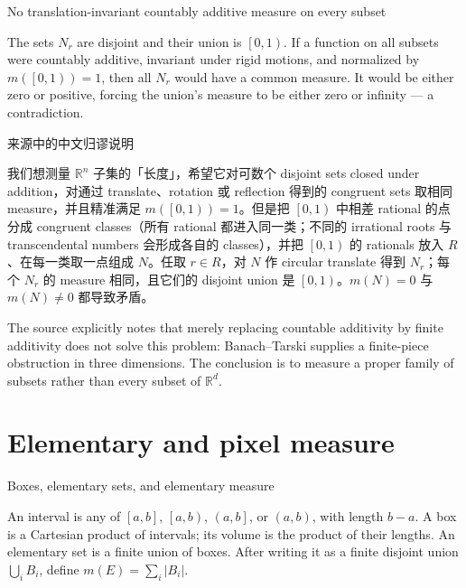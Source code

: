 \begin{theorem}{No translation-invariant countably additive measure on every subset}

The sets \(N_{r}\) are disjoint and their union is \(\left\lbrack {0,1} \right)\). If a function on all subsets were countably additive, invariant under rigid motions, and normalized by \(m\left( \left\lbrack {0,1} \right) \right) = 1\), then all \(N_{r}\) would have a common measure. It would be either zero or positive, forcing the union's measure to be either zero or infinity --- a contradiction.

\end{theorem}

\begin{qlsolution}{来源中的中文归谬说明}

我们想测量 \(\mathbb{R}^{n}\) 子集的「长度」，希望它对可数个 disjoint sets closed under addition，对通过 translate、rotation 或 reflection 得到的 congruent sets 取相同 measure，并且精准满足 \(m\left( \left\lbrack {0,1} \right) \right) = 1\)。但是把 \(\left\lbrack {0,1} \right)\) 中相差 rational 的点分成 congruent classes（所有 rational 都进入同一类；不同的 irrational roots 与 transcendental numbers 会形成各自的 classes），并把 \(\left\lbrack {0,1} \right)\) 的 rationals 放入 \(R\)、在每一类取一点组成 \(N\)。任取 \(r \in R\)，对 \(N\) 作 circular translate 得到 \(N_{r}\)；每个 \(N_{r}\) 的 measure 相同，且它们的 disjoint union 是 \(\left\lbrack {0,1} \right)\)。\(m(N) = 0\) 与 \(m(N) \neq 0\) 都导致矛盾。

\end{qlsolution}

The source explicitly notes that merely replacing countable additivity by finite additivity does not solve this problem: Banach--Tarski supplies a finite-piece obstruction in three dimensions. The conclusion is to measure a proper family of subsets rather than every subset of \(\mathbb{R}^{d}\).

\section{Elementary and pixel measure}

\begin{definition}{Boxes, elementary sets, and elementary measure}

An interval is any of \(\left\lbrack {a,b} \right\rbrack\), \(\left\lbrack {a,b} \right)\), \(\left( {a,b} \right\rbrack\), or \(\left( {a,b} \right)\), with length \(b - a\). A box is a Cartesian product of intervals; its volume is the product of their lengths. An elementary set is a finite union of boxes. After writing it as a finite disjoint union \(\bigcup_{i}B_{i}\), define \(m(E) = \sum_{i}\left| B_{i} \right|\).

\end{definition}

